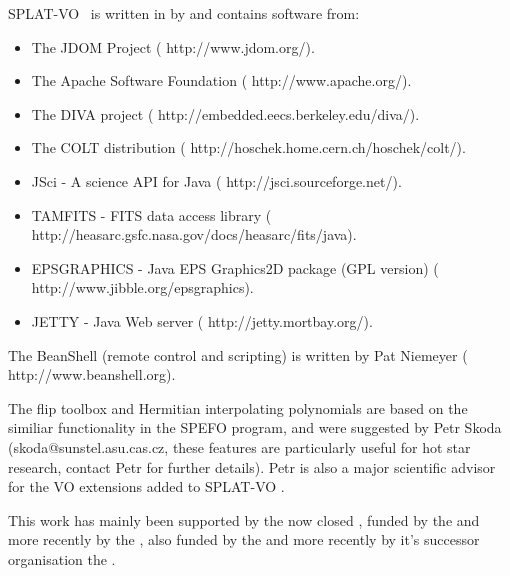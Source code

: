 \documentclass[twoside,11pt,nolof]{starlink}
\providecommand{\SPLAT}{\textsf{SPLAT-VO }}
\begin{document}
\SPLAT\ is written in
 by
 and
contains software from:
\begin{itemize}
\item The JDOM Project (
                                          {http://www.jdom.org/}).
\item The Apache Software Foundation
      (
                         {http://www.apache.org/}).
\item The DIVA project
      (
                         {http://embedded.eecs.berkeley.edu/diva/}).
\item The COLT distribution
      (
                         {http://hoschek.home.cern.ch/hoschek/colt/}).
\item JSci - A science API for Java
      (
                         {http://jsci.sourceforge.net/}).
\item TAMFITS - FITS data access library
      (
                         {http://heasarc.gsfc.nasa.gov/docs/heasarc/fits/java}).
\item EPSGRAPHICS - Java EPS Graphics2D package (GPL version)
      (
                         {http://www.jibble.org/epsgraphics}).
\item JETTY - Java Web server
      (
                         {http://jetty.mortbay.org/}).
\end{itemize}

The BeanShell (remote control and scripting) is written by Pat
Niemeyer (
                            {http://www.beanshell.org}).

The flip toolbox and Hermitian interpolating polynomials are based on the
similiar functionality in the SPEFO program, and were suggested by Petr Skoda
(skoda@sunstel.asu.cas.cz, these features are particularly useful for hot star
research, contact Petr for further details). Petr is also a major scientific
advisor for the VO extensions added to \SPLAT.

This work has mainly been supported by the now closed
,
funded by the
and more recently by the
,
also funded by the
and more recently by it's successor organisation the
.
\end{document}
